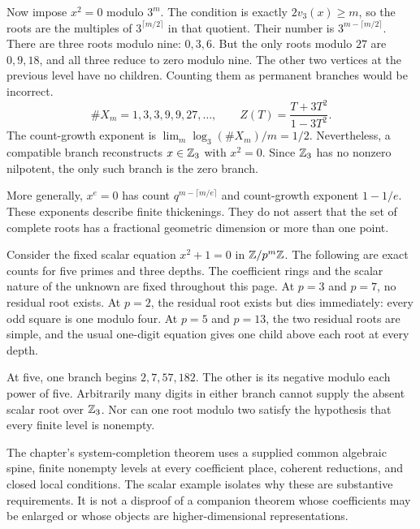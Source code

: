 Now impose $x^2=0$ modulo $3^m$. The condition is exactly $2v_3(x)\ge m$, so the roots are the multiples of $3^{\lceil m/2\rceil}$ in that quotient. Their number is $3^{m-\lceil m/2\rceil}$.
There are three roots modulo nine: $0,3,6$. But the only roots modulo $27$ are $0,9,18$, and all three reduce to zero modulo nine. The other two vertices at the previous level have no children. Counting them as permanent branches would be incorrect.
\[
\#X_m=1,3,3,9,9,27,\ldots,
\qquad Z(T)=\frac{T+3T^2}{1-3T^2}.
\]
The count-growth exponent is $\lim_m\log_3(\#X_m)/m=1/2$. Nevertheless, a compatible branch reconstructs $x\in\mathbb Z_3$ with $x^2=0$. Since $\mathbb Z_3$ has no nonzero nilpotent, the only such branch is the zero branch.

More generally, $x^e=0$ has count $q^{m-\lceil m/e\rceil}$ and count-growth exponent $1-1/e$. These exponents describe finite thickenings. They do not assert that the set of complete roots has a fractional geometric dimension or more than one point.

Consider the fixed scalar equation $x^2+1=0$ in $\mathbb Z/p^m\mathbb Z$. The following are exact counts for five primes and three depths. The coefficient rings and the scalar nature of the unknown are fixed throughout this page.
At $p=3$ and $p=7$, no residual root exists. At $p=2$, the residual root exists but dies immediately: every odd square is one modulo four. At $p=5$ and $p=13$, the two residual roots are simple, and the usual one-digit equation gives one child above each root at every depth.

At five, one branch begins $2,7,57,182$. The other is its negative modulo each power of five. Arbitrarily many digits in either branch cannot supply the absent scalar root over $\mathbb Z_3$. Nor can one root modulo two satisfy the hypothesis that every finite level is nonempty.

The chapter's system-completion theorem uses a supplied common algebraic spine, finite nonempty levels at every coefficient place, coherent reductions, and closed local conditions. The scalar example isolates why these are substantive requirements. It is not a disproof of a companion theorem whose coefficients may be enlarged or whose objects are higher-dimensional representations.


